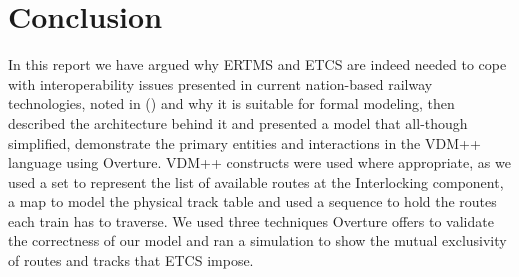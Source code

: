 \documentclass[preprint,12pt]{elsarticle}
\begin{document}
\section{Conclusion}

In this report we have argued why ERTMS and ETCS are indeed needed to cope with interoperability issues presented in current nation-based railway technologies, noted in (\citet{Commission2018}) and why it is suitable for formal modeling, then described the architecture behind it and presented a model that all-though simplified, demonstrate the primary entities and interactions in the VDM++ language using Overture. VDM++ constructs were used where appropriate, as we used a set to represent the list of available routes at the Interlocking component, a map to model the physical track table and used a sequence to hold the routes each train has to traverse. We used three techniques Overture offers to validate the correctness of our model and ran a simulation to show the mutual exclusivity of routes and tracks that ETCS impose.













\end{document}
